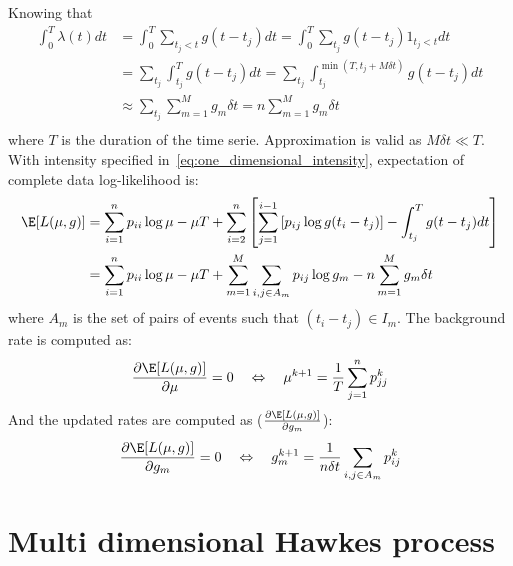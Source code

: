 \documentclass[a4paper]{article}
\begin{document}
Knowing that
\begin{align*}
	\int_0^T \lambda(t) dt &= \int_0^T \sum_{t_j < t} g(t - t_j) dt = \int_0^T \sum_{t_j} g(t - t_j) 1_{t_j < t} dt \\
						   &= \sum_{t_j} \int_{t_j}^T g(t - t_j) dt
						    = \sum_{t_j} \int_{t_j}^{\min (T, t_j + M \delta t)} g(t - t_j) dt \\
						   &\approx \sum_{t_j} \sum_{m=1}^M g_m \delta t = n \sum_{m=1}^M g_m \delta t \\
\end{align*}
where $T$ is the duration of the time serie. Approximation is valid as $M \delta t \ll T$.
With intensity specified in~\ref{eq:one_dimensional_intensity}, expectation of complete data log-likelihood is:
\begin{align}
\label{eq:complete_data_loglik_expectation}
	\E[ L(\mu, g)] &= \sum_{i=1}^n p_{ii} \log \mu - \mu T
	             + \sum_{i=2}^n \left[ \sum_{j=1}^{i-1} \left[ p_{ij} \log g(t_i - t_j) \right]
	                                   - \int_{t_j}^T g(t - t_j) dt \right] \\
              &= \sum_{i=1}^n p_{ii} \log \mu - \mu T
                 + \sum_{m=1}^M \sum_{i, j \in A_m} p_{ij} \log g_m
                 - n \sum_{m=1}^M g_m \delta t \\
\end{align}
where $A_m$ is the set of pairs of events such that $(t_i - t_j) \in I_m$.
The background rate is computed as:
\begin{equation}
	\label{eq:maximization_baseline}
	\frac{\partial \E[ L(\mu, g)]}{\partial \mu} = 0
	\quad \Leftrightarrow \quad
	\mu^{k+1} = \frac{1}{T} \sum_{j=1}^{n} p_{jj}^k
\end{equation}
And the updated rates are computed as ($\frac{\partial \E[ L(\mu, g)]}{\partial g_m}$):
\begin{equation}
	\label{eq:maximization_rates}
	\frac{\partial \E[ L(\mu, g)]}{\partial g_m} = 0
	\quad \Leftrightarrow \quad
	g_m^{k+1} = \frac{1}{n \delta t } \sum_{i,j \in A_m} p_{ij}^k
\end{equation}





\section{Multi dimensional Hawkes process} %
\label{sec:multi_dimensional_hawkes_process}
\end{document}
